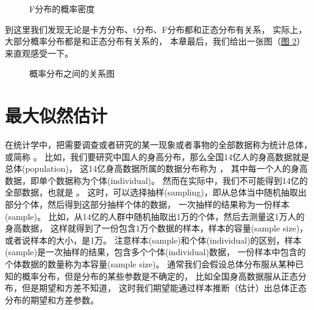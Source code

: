 \documentclass[letterpaper,10pt,english]{sphinxmanual}
\begin{document}
\begin{figure}[htbp]
\centering
\capstart

\noindent{}
\caption{F分布的概率密度}\label{\detokenize{_u6982_u7387_u57fa_u7840/content:id34}}\label{\detokenize{_u6982_u7387_u57fa_u7840/content:fg-probability-017}}\end{figure}

到这里我们发现无论是卡方分布、t分布、F分布都和正态分布有关系，
实际上，大部分概率分布都是和正态分布有关系的，
本章最后，我们给出一张图（\hyperref[\detokenize{_u6982_u7387_u57fa_u7840/content:fg-probability-020}]{图 \ref{\detokenize{_u6982_u7387_u57fa_u7840/content:fg-probability-020}}}）来直观感受一下。

\begin{figure}[htbp]
\centering
\capstart

\noindent{}
\caption{概率分布之间的关系图}\label{\detokenize{_u6982_u7387_u57fa_u7840/content:id35}}\label{\detokenize{_u6982_u7387_u57fa_u7840/content:fg-probability-020}}\end{figure}


\chapter{最大似然估计}
\label{\detokenize{_u6700_u5927_u4f3c_u7136_u4f30_u8ba1/content:ch-estimate}}\label{\detokenize{_u6700_u5927_u4f3c_u7136_u4f30_u8ba1/content:id1}}\label{\detokenize{_u6700_u5927_u4f3c_u7136_u4f30_u8ba1/content::doc}}
在统计学中，把需要调查或者研究的某一现象或者事物的全部数据称为统计总体，或简称 。
比如，我们要研究中国人的身高分布，那么全国14亿人的身高数据就是总体(population)，
这14亿身高数据所属的数据分布称为 ，
其中每一个人的身高数据，即单个数据称为个体(individual)。
然而在实际中，我们不可能得到14亿的全部数据，也就是  。
这时，可以选择抽样(sampling)，即从总体当中随机抽取出部分个体，然后得到这部分抽样个体的数据，
一次抽样的结果称为一份样本(sample)。
比如，从14亿的人群中随机抽取出1万的个体，然后去测量这1万人的身高数据，
这样就得到了一份包含1万个数据的样本，样本的容量(sample size)，或者说样本的大小，是1万。
注意样本(sample)和个体(individual)的区别，样本(sample)是一次抽样的结果，包含多个个体(individual)数据，
一份样本中包含的个体数据的数量称为本容量(sample size)。
通常我们会假设总体分布服从某种已知的概率分布，但是分布的某些参数是不确定的，
比如全国身高数据服从正态分布，但是期望和方差不知道，
这时我们期望能通过样本推断（估计）出总体正态分布的期望和方差参数。
\end{document}
